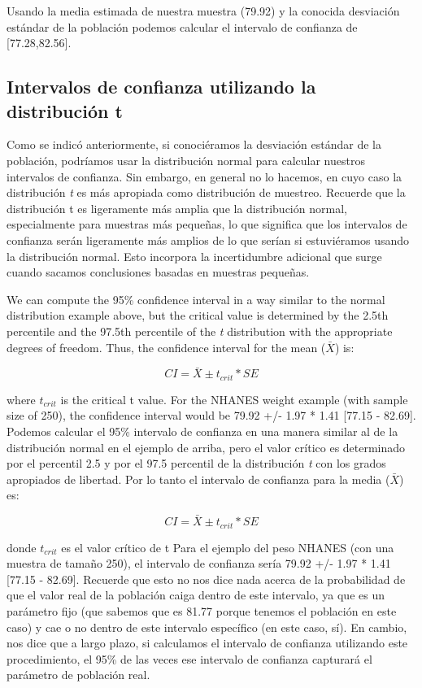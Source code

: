 \documentclass[
  12pt,
]{book}
\theoremstyle{definition}
\theoremstyle{definition}
\theoremstyle{definition}
\theoremstyle{remark}
\begin{document}
Usando la media estimada de nuestra muestra (79.92) y la conocida desviación estándar de la población podemos calcular el intervalo de confianza de {[}77.28,82.56{]}.

\hypertarget{intervalos-de-confianza-utilizando-la-distribuciuxf3n-t}{%
\subsection{Intervalos de confianza utilizando la distribución t}\label{intervalos-de-confianza-utilizando-la-distribuciuxf3n-t}}

Como se indicó anteriormente, si conociéramos la desviación estándar de la población, podríamos usar la distribución normal para calcular nuestros intervalos de confianza. Sin embargo, en general no lo hacemos, en cuyo caso la distribución \emph{t} es más apropiada como distribución de muestreo. Recuerde que la distribución t es ligeramente más amplia que la distribución normal, especialmente para muestras más pequeñas, lo que significa que los intervalos de confianza serán ligeramente más amplios de lo que serían si estuviéramos usando la distribución normal. Esto incorpora la incertidumbre adicional que surge cuando sacamos conclusiones basadas en muestras pequeñas.

We can compute the 95\% confidence interval in a way similar to the normal distribution example above, but the critical value is determined by the 2.5th percentile and the 97.5th percentile of the \emph{t} distribution with the appropriate degrees of freedom. Thus, the confidence interval for the mean (\(\bar{X}\)) is:

\[
CI = \bar{X} \pm t_{crit}*SE
\]

where \(t_{crit}\) is the critical t value.
For the NHANES weight example (with sample size of 250), the confidence interval would be 79.92 +/- 1.97 * 1.41 {[}77.15 - 82.69{]}.
Podemos calcular el 95\% intervalo de confianza en una manera similar al de la distribución normal en el ejemplo de arriba, pero el valor crítico es determinado por el percentil 2.5 y por el 97.5 percentil de la distribución \emph{t} con los grados apropiados de libertad. Por lo tanto el intervalo de confianza para la media (\(\bar{X}\)) es:

\[
CI = \bar{X} \pm t_{crit}*SE
\]

donde \(t_{crit}\) es el valor crítico de t
Para el ejemplo del peso NHANES (con una muestra de tamaño 250), el intervalo de confianza sería 79.92 +/- 1.97 * 1.41 {[}77.15 - 82.69{]}.
Recuerde que esto no nos dice nada acerca de la probabilidad de que el valor real de la población caiga dentro de este intervalo, ya que es un parámetro fijo (que sabemos que es 81.77 porque tenemos el población en este caso) y cae o no dentro de este intervalo específico (en este caso, sí). En cambio, nos dice que a largo plazo, si calculamos el intervalo de confianza utilizando este procedimiento, el 95\% de las veces ese intervalo de confianza capturará el parámetro de población real.
\end{document}
